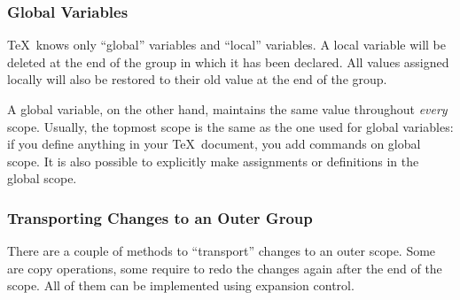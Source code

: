 \documentclass[a4paper,doc2]{ltxdoc}
\begin{document}
\subsubsection{Global Variables}
\TeX\ knows only ``global'' variables and ``local'' variables. A local variable will be deleted at the end of the group in which it has been declared. All values assigned locally will also be restored to their old value at the end of the group.

A global variable, on the other hand, maintains the same value throughout \emph{every} scope. Usually, the topmost scope is the same as the one used for global variables: if you define anything in your \TeX\ document, you add commands on global scope. It is also possible to explicitly make assignments or definitions in the global scope.




\subsubsection{Transporting Changes to an Outer Group}
There are a couple of methods to ``transport'' changes to an outer scope. Some are copy operations, some require to redo the changes again after the end of the scope. All of them can be implemented using expansion control.
\end{document}
